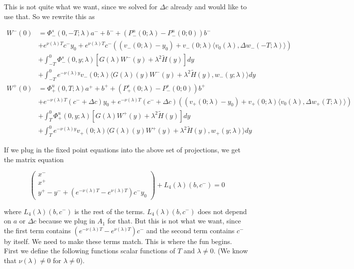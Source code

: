 \documentclass[12pt]{article}
\begin{document}
\begin{enumerate}
This is not quite what we want, since we solved for $\Delta c$ already and would like to use that. So we rewrite this as

\begin{align*}
W^-(0) &= \Phi^s_-(0, -T; \lambda )a^- + b^- + (P^u_-(0; \lambda) - P^u_-(0; 0))b^- \\
&+ e^{\nu(\lambda)T} c^- y_0 + e^{\nu(\lambda)T} c^- ( (v_-(0; \lambda) - y_0) + v_-(0; \lambda) \langle  v_0(\lambda), \Delta w_-(-T; \lambda) \rangle) \\
&+ \int_{-T}^0 \Phi^s_-(0, y; \lambda) [ G(\lambda)W^-(y) + \lambda^2 \tilde{H}(y) ] dy \\
&+ \int_{-T}^0 
e^{-\nu(\lambda)y} v_-(0; \lambda) \langle G(\lambda)(y)W^-(y) + \lambda^2 \tilde{H}(y), w_-(y; \lambda) \rangle dy \\
W^+(0) &= \Phi^u_+(0, T; \lambda)a^+ + b^+ + (P^s_+(0; \lambda) - P^s_-(0; 0))b^+ \\
&+ e^{-\nu(\lambda)T} (c^- + \Delta c) y_0 + e^{-\nu(\lambda)T} (c^- + \Delta c) ( (v_+(0; \lambda) - y_0) + v_+(0; \lambda) \langle  v_0(\lambda), \Delta w_+(T; \lambda) \rangle) \\
&+ \int_T^0 \Phi^u_+(0, y; \lambda) [ G(\lambda)W^+(y) + \lambda^2 \tilde{H}(y) ] dy \\
&+ \int_T^0 e^{-\nu(\lambda)y} v_+(0; \lambda) \langle G(\lambda)(y)W^+(y) + \lambda^2 \tilde{H}(y), w_+(y; \lambda) \rangle dy
\end{align*}


If we plug in the fixed point equations into the above set of projections, we get the matrix equation

\[
\begin{pmatrix}x^- \\ x^+ \\ y^+ - y^- + (e^{-\nu(\lambda)T} - e^{\nu(\lambda)T}) c^- y_0 \end{pmatrix} + L_4(\lambda)(b, c^-) = 0
\]

where $L_4(\lambda)(b, c^-)$ is the rest of the terms. $L_4(\lambda)(b, c^-)$ does not depend on $a$ or $\Delta c$ because we plug in $A_1$ for that. But this is not what we want, since the first term contains $(e^{-\nu(\lambda)T} - e^{\nu(\lambda)T}) c^-$ and the second term contains $c^-$ by itself. We need to make these terms match. This is where the fun begins.
\\

First we define the following functions scalar functions of $T$ and $\lambda \neq 0$. (We know that $\nu(\lambda) \neq 0$ for $\lambda \neq 0$).


\end{enumerate}
\end{document}
